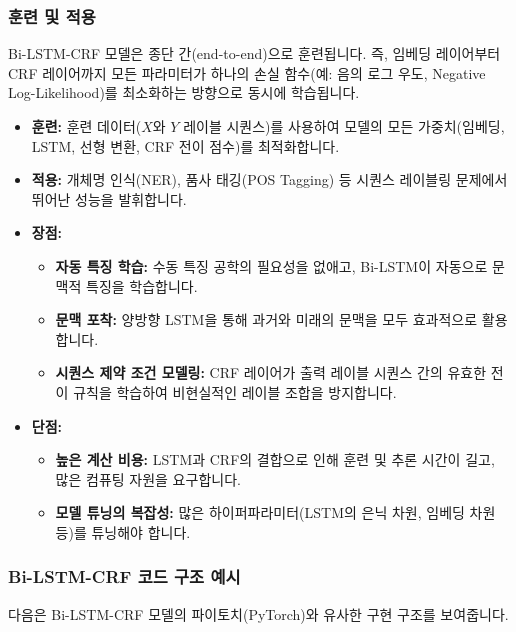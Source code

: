 \documentclass[11pt,a4paper]{article}
\begin{document}
\subsubsection{훈련 및 적용}
Bi-LSTM-CRF 모델은 종단 간(end-to-end)으로 훈련됩니다. 즉, 임베딩 레이어부터 CRF 레이어까지 모든 파라미터가 하나의 손실 함수(예: 음의 로그 우도, Negative Log-Likelihood)를 최소화하는 방향으로 동시에 학습됩니다.

\begin{itemize}
    \item \textbf{훈련:} 훈련 데이터($X$와 $Y$ 레이블 시퀀스)를 사용하여 모델의 모든 가중치(임베딩, LSTM, 선형 변환, CRF 전이 점수)를 최적화합니다.
    \item \textbf{적용:} 개체명 인식(NER), 품사 태깅(POS Tagging) 등 시퀀스 레이블링 문제에서 뛰어난 성능을 발휘합니다.
\item \textbf{장점:}
    \begin{itemize}
        \item \textbf{자동 특징 학습:} 수동 특징 공학의 필요성을 없애고, Bi-LSTM이 자동으로 문맥적 특징을 학습합니다.
        \item \textbf{문맥 포착:} 양방향 LSTM을 통해 과거와 미래의 문맥을 모두 효과적으로 활용합니다.
        \item \textbf{시퀀스 제약 조건 모델링:} CRF 레이어가 출력 레이블 시퀀스 간의 유효한 전이 규칙을 학습하여 비현실적인 레이블 조합을 방지합니다.
    \end{itemize}
    \item \textbf{단점:}
    \begin{itemize}
        \item \textbf{높은 계산 비용:} LSTM과 CRF의 결합으로 인해 훈련 및 추론 시간이 길고, 많은 컴퓨팅 자원을 요구합니다.
        \item \textbf{모델 튜닝의 복잡성:} 많은 하이퍼파라미터(LSTM의 은닉 차원, 임베딩 차원 등)를 튜닝해야 합니다.
    \end{itemize}
\end{itemize}

\subsubsection{Bi-LSTM-CRF 코드 구조 예시}
다음은 Bi-LSTM-CRF 모델의 파이토치(PyTorch)와 유사한 구현 구조를 보여줍니다.
\end{document}
